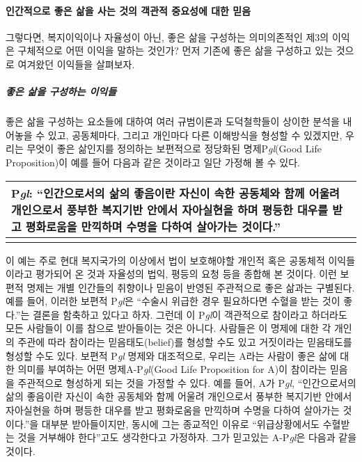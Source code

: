 \paragraph{인간적으로 좋은 삶을 사는 것의 객관적 중요성에 대한 믿음}

그렇다면, 복지이익이나 자율성이 아닌, 좋은 삶을 구성하는 의미의존적인 제3의 이익은 구체적으로 어떤 이익을 말하는 것인가? 먼저 기존에 좋은 삶을 구성하고 있는 것으로 여겨왔던 이익들을 살펴보자.

\subparagraph{좋은 삶을 구성하는 이익들}

좋은 삶을 구성하는 요소들에 대하여 여러 규범이론과 도덕철학들이 상이한 분석을 내어놓을 수 있고, 공동체마다, 그리고 개인마다 다른 이해방식을 형성할 수 있겠지만, 우리는 무엇이 좋은 삶인지를 정의하는 보편적으로 정당화된 명제P\emph{gl}(Good Life Proposition)이 예를 들어 다음과 같은 것이라고 일단 가정해 볼 수 있다.

\begin{longtable}[]{@{}
  >{\raggedright\arraybackslash}p{}@{}}
\toprule\noalign{}
\begin{minipage}[b]{\linewidth}\raggedright
\textbf{P\emph{gl}}: ``인간으로서의 삶의 좋음이란 자신이 속한 공동체와 함께 어울려 개인으로서 풍부한 복지기반 안에서 자아실현을 하며 평등한 대우를 받고 평화로움을 만끽하며 수명을 다하여 살아가는 것이다.''
\end{minipage} \\
\midrule\noalign{}
\endhead
\bottomrule\noalign{}
\endlastfoot
\end{longtable}

이 예는 주로 현대 복지국가의 이상에서 법이 보호해야할 개인적 혹은 공동체적 이익들이라고 평가되어 온 것과 자율성의 법익, 평등의 요청 등을 종합해 본 것이다. 이런 보편적 명제는 개별 인간들의 취향이나 믿음이 반영된 주관적으로 좋은 삶과는 구별된다. 예를 들어, 이러한 보편적 P\emph{gl}은 ``수술시 위급한 경우 필요하다면 수혈을 받는 것이 좋다.''는 결론을 함축하고 있다고 하자. 그런데 이 P\emph{gl}이 객관적으로 참이라고 하더라도 모든 사람들이 이를 참으로 받아들이는 것은 아니다. 사람들은 이 명제에 대한 각 개인의 주관에 따라 참이라는 믿음태도(belief)를 형성할 수도 있고 거짓이라는 믿음태도를 형성할 수도 있다. 보편적 P\emph{gl} 명제와 대조적으로, 우리는 A라는 사람이 좋은 삶에 대한 의미를 부여하는 어떤 명제A-P\emph{gl}(Good Life Proposition for A)이 참이라는 믿음을 주관적으로 형성하게 되는 것을 가정할 수 있다. 예를 들어, A가 P\emph{gl}, ``인간으로서의 삶의 좋음이란 자신이 속한 공동체와 함께 어울려 개인으로서 풍부한 복지기반 안에서 자아실현을 하며 평등한 대우를 받고 평화로움을 만끽하며 수명을 다하여 살아가는 것이다.''을 대부분 받아들이지만, 동시에 그는 종교적인 이유로 ``위급상황에서도 수혈받는 것을 거부해야 한다''고도 생각한다고 가정하자. 그가 믿고있는 A-P\emph{gl}은 다음과 같을 것이다.

